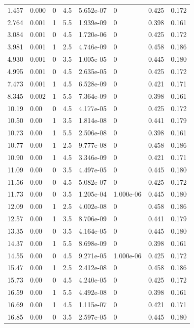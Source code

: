 \documentclass[preview]{standalone}
\begin{document}
{{\begin{tabular}{L{1.2cm}C{1.2cm} C{0.3cm}C{0.5cm} C{1.4cm}C{1.4cm} C{1.4cm}C{1.4cm}}
  1.457  &  0.000  & 0     & 4.5 &  5.652e-07  & 0  & 0.425 &  0.172   \\ 
  2.764  &  0.001  & 1     & 5.5 &  1.939e-09  & 0  & 0.398 &  0.161   \\ 
  3.084  &  0.001  & 0     & 4.5 &  1.720e-06  & 0  & 0.425 &  0.172   \\ 
  3.981  &  0.001  & 1     & 2.5 &  4.746e-09  & 0  & 0.458 &  0.186   \\ 
  4.930  &  0.001  & 0     & 3.5 &  1.005e-05  & 0  & 0.445 &  0.180   \\ 
  4.995  &  0.001  & 0     & 4.5 &  2.635e-05  & 0  & 0.425 &  0.172   \\ 
  7.473  &  0.001  & 1     & 4.5 &  6.528e-09  & 0  & 0.421 &  0.171   \\ 
  8.345  &  0.002  & 1     & 5.5 &  7.364e-09  & 0  & 0.398 &  0.161   \\ 
  10.19  &  0.00  & 0     & 4.5 &  4.177e-05  & 0  & 0.425 &  0.172   \\ 
  10.50  &  0.00  & 1     & 3.5 &  1.814e-08  & 0  & 0.441 &  0.179   \\ 
  10.73  &  0.00  & 1     & 5.5 &  2.506e-08  & 0  & 0.398 &  0.161   \\ 
  10.77  &  0.00  & 1     & 2.5 &  9.777e-08  & 0  & 0.458 &  0.186   \\ 
  10.90  &  0.00  & 1     & 4.5 &  3.346e-09  & 0  & 0.421 &  0.171   \\ 
  11.09  &  0.00  & 0     & 3.5 &  4.497e-05  & 0  & 0.445 &  0.180   \\ 
  11.56  &  0.00  & 0     & 4.5 &  5.082e-07  & 0  & 0.425 &  0.172   \\ 
  11.73  &  0.00  & 0     & 3.5 &  1.205e-04  & 1.000e-06  & 0.445 &  0.180   \\ 
  12.09  &  0.00  & 1     & 2.5 &  4.002e-08  & 0  & 0.458 &  0.186   \\ 
  12.57  &  0.00  & 1     & 3.5 &  8.706e-09  & 0  & 0.441 &  0.179   \\ 
  13.35  &  0.00  & 0     & 3.5 &  4.164e-05  & 0  & 0.445 &  0.180   \\ 
  14.37  &  0.00  & 1     & 5.5 &  8.698e-09  & 0  & 0.398 &  0.161   \\ 
  14.55  &  0.00  & 0     & 4.5 &  9.271e-05  & 1.000e-06  & 0.425 &  0.172   \\ 
  15.47  &  0.00  & 1     & 2.5 &  2.412e-08  & 0  & 0.458 &  0.186   \\ 
  15.73  &  0.00  & 0     & 4.5 &  4.240e-05  & 0  & 0.425 &  0.172   \\ 
  16.59  &  0.00  & 1     & 5.5 &  4.492e-08  & 0  & 0.398 &  0.161   \\ 
  16.69  &  0.00  & 1     & 4.5 &  1.115e-07  & 0  & 0.421 &  0.171   \\ 
  16.85  &  0.00  & 0     & 3.5 &  2.597e-05  & 0  & 0.445 &  0.180   \\ 
\hline 
\end{tabular} 

}}
\end{document}

